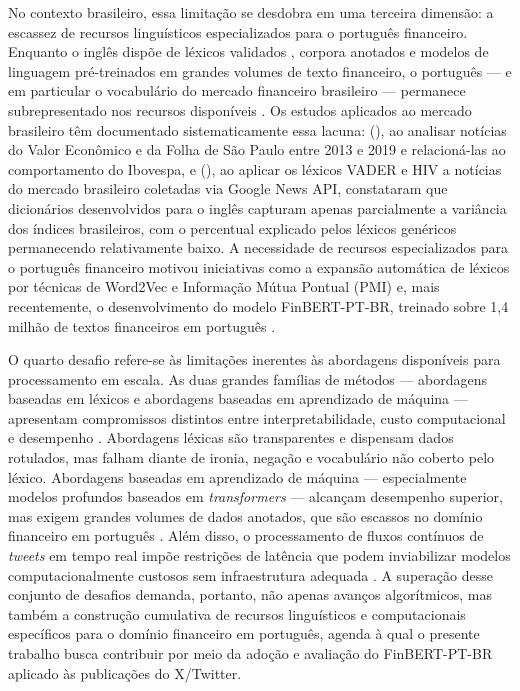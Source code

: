 No contexto brasileiro, essa limitação se desdobra em uma terceira dimensão: a escassez de recursos linguísticos especializados para o português financeiro. Enquanto o inglês dispõe de léxicos validados \cite{loughran2011}, corpora anotados e modelos de linguagem pré-treinados em grandes volumes de texto financeiro, o português --- e em particular o vocabulário do mercado financeiro brasileiro --- permanece subrepresentado nos recursos disponíveis \cite{sousa2025}. Os estudos aplicados ao mercado brasileiro têm documentado sistematicamente essa lacuna: \citeauthor{falcao2020} (\citeyear{falcao2020}), ao analisar notícias do Valor Econômico e da Folha de São Paulo entre 2013 e 2019 e relacioná-las ao comportamento do Ibovespa, e \citeauthor{lucas2025} (\citeyear{lucas2025}), ao aplicar os léxicos VADER e HIV a notícias do mercado brasileiro coletadas via Google News API, constataram que dicionários desenvolvidos para o inglês capturam apenas parcialmente a variância dos índices brasileiros, com o percentual explicado pelos léxicos genéricos permanecendo relativamente baixo. A necessidade de recursos especializados para o português financeiro motivou iniciativas como a
expansão automática de léxicos por técnicas de Word2Vec e Informação Mútua Pontual (PMI) \cite{sousa2025} e, mais recentemente, o desenvolvimento do modelo FinBERT-PT-BR, treinado sobre 1,4 milhão de textos financeiros em português \cite{santos2023finbert}.

O quarto desafio refere-se às limitações inerentes às abordagens disponíveis para processamento em escala. As duas grandes famílias de métodos --- abordagens baseadas em léxicos e abordagens baseadas em aprendizado de máquina --- apresentam compromissos distintos entre interpretabilidade, custo computacional e desempenho \cite{kearney2014}. Abordagens léxicas são transparentes e dispensam dados rotulados, mas falham diante de ironia, negação e vocabulário não coberto pelo léxico. Abordagens
baseadas em aprendizado de máquina --- especialmente modelos profundos baseados em \textit{transformers} --- alcançam desempenho superior, mas exigem grandes
volumes de dados anotados, que são escassos no domínio financeiro em português \cite{liu2020survey,santos2023finbert}. Além disso, o processamento de fluxos
contínuos de \textit{tweets} em tempo real impõe restrições de latência que podem inviabilizar modelos computacionalmente custosos sem infraestrutura adequada \cite{silva2025}. A superação desse conjunto de desafios demanda, portanto, não apenas avanços algorítmicos, mas também a construção cumulativa de recursos linguísticos e computacionais específicos para o domínio financeiro em português, agenda à qual o presente trabalho busca contribuir por meio da adoção e avaliação do FinBERT-PT-BR aplicado às publicações do X/Twitter.